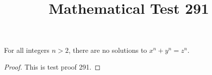 \documentclass{amsart}
\begin{document}
\title{Mathematical Test 291}
\begin{theorem}
For all integers $n > 2$, there are no solutions to $x^n + y^n = z^n$.
\end{theorem}
\begin{proof}
This is test proof 291.
\end{proof}
\end{document}
